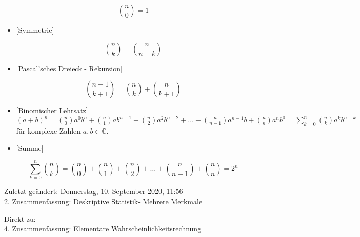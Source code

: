 \documentclass[10pt]{article}
\begin{document}
$$
\binom{n}{0}=1
$$

\begin{itemize}
  \item \hspace{0pt} [Symmetrie]
\end{itemize}

$$
\binom{n}{k}=\binom{n}{n-k}
$$

\begin{itemize}
  \item \hspace{0pt} [Pascal'sches Dreieck - Rekursion]
\end{itemize}

$$
\binom{n+1}{k+1}=\binom{n}{k}+\binom{n}{k+1}
$$

\begin{itemize}
  \item \hspace{0pt} [Binomischer Lehrsatz]\\
$(a+b)^{n}=\binom{n}{0} a^{0} b^{n}+\binom{n}{1} a b^{n-1}+\binom{n}{2} a^{2} b^{n-2}+\ldots+\binom{n}{n-1} a^{n-1} b+\binom{n}{n} a^{n} b^{0}=\sum_{k=0}^{n}\binom{n}{k} a^{k} b^{n-k}$\\
für komplexe Zahlen $a, b \in \mathbb{C}$.
  \item \hspace{0pt} [Summe]
\end{itemize}

$$
\sum_{k=0}^{n}\binom{n}{k}=\binom{n}{0}+\binom{n}{1}+\binom{n}{2}+\ldots+\binom{n}{n-1}+\binom{n}{n}=2^{n}
$$

Zuletzt geändert: Donnerstag, 10. September 2020, 11:56\\
2. Zusammenfassung: Deskriptive Statistik- Mehrere Merkmale

Direkt zu:\\
4. Zusammenfassung: Elementare Wahrscheinlichkeitsrechnung
\end{document}
